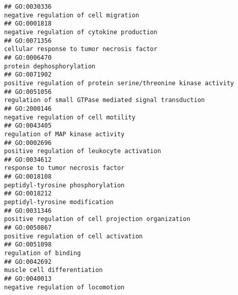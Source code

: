 \documentclass[
]{article}
\begin{document}
\begin{verbatim}
## GO:0030336                                                                                                            negative regulation of cell migration
## GO:0001818                                                                                                       negative regulation of cytokine production
## GO:0071356                                                                                                       cellular response to tumor necrosis factor
## GO:0006470                                                                                                                        protein dephosphorylation
## GO:0071902                                                                                  positive regulation of protein serine/threonine kinase activity
## GO:0051056                                                                                          regulation of small GTPase mediated signal transduction
## GO:2000146                                                                                                             negative regulation of cell motility
## GO:0043405                                                                                                                regulation of MAP kinase activity
## GO:0002696                                                                                                      positive regulation of leukocyte activation
## GO:0034612                                                                                                                response to tumor necrosis factor
## GO:0018108                                                                                                                peptidyl-tyrosine phosphorylation
## GO:0018212                                                                                                                   peptidyl-tyrosine modification
## GO:0031346                                                                                              positive regulation of cell projection organization
## GO:0050867                                                                                                           positive regulation of cell activation
## GO:0051098                                                                                                                            regulation of binding
## GO:0042692                                                                                                                      muscle cell differentiation
## GO:0040013                                                                                                                negative regulation of locomotion

\end{verbatim}
\end{document}
